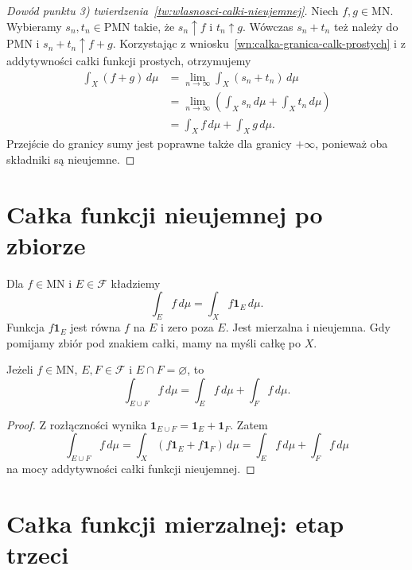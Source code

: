 \begin{proof}[Dowód punktu 3) twierdzenia~\ref{tw:wlasnosci-calki-nieujemnej}]
Niech $f,g\in\mathrm{MN}$. Wybieramy $s_n,t_n\in\mathrm{PMN}$ takie,
że $s_n\uparrow f$ i $t_n\uparrow g$. Wówczas $s_n+t_n$ też należy
do~$\mathrm{PMN}$ i $s_n+t_n\uparrow f+g$. Korzystając z
wniosku~\ref{wn:calka-granica-calk-prostych} i z addytywności całki
funkcji prostych, otrzymujemy
\begin{align*}
  \int_X(f+g)\,d\mu
  &=\lim_{n\to\infty}\int_X(s_n+t_n)\,d\mu\\
  &=\lim_{n\to\infty}\left(\int_X s_n\,d\mu+\int_X t_n\,d\mu\right)\\
  &=\int_X f\,d\mu+\int_X g\,d\mu.
\end{align*}
Przejście do granicy sumy jest poprawne także dla granicy $+\infty$,
ponieważ oba składniki są nieujemne.
\end{proof}

\section{Całka funkcji nieujemnej po zbiorze}
\label{sec:calka-nieujemnej-po-zbiorze}

\begin{definicja}
\label{def:calka-nieujemnej-po-zbiorze}
Dla $f\in\mathrm{MN}$ i $E\in\mathcal F$ kładziemy
\[
  \int_E f\,d\mu=\int_X f\mathbf{1}_E\,d\mu.
\]
Funkcja $f\mathbf{1}_E$ jest równa $f$ na $E$ i zero poza $E$.
Jest mierzalna i nieujemna. Gdy pomijamy zbiór pod znakiem całki,
mamy na myśli całkę po $X$.
\end{definicja}

\begin{fakt}
\label{fakt:calka-nieujemnej-po-rozlacznych}
Jeżeli $f\in\mathrm{MN}$, $E,F\in\mathcal F$ i $E\cap F=\varnothing$, to
\[
  \int_{E\cup F} f\,d\mu=\int_E f\,d\mu+\int_F f\,d\mu.
\]
\end{fakt}

\begin{proof}
Z rozłączności wynika $\mathbf{1}_{E\cup F}=\mathbf{1}_E+\mathbf{1}_F$.
Zatem
\[
  \int_{E\cup F} f\,d\mu
  =\int_X(f\mathbf{1}_E+f\mathbf{1}_F)\,d\mu
  =\int_E f\,d\mu+\int_F f\,d\mu
\]
na mocy addytywności całki funkcji nieujemnej.
\end{proof}

\section{Całka funkcji mierzalnej: etap trzeci}
\label{sec:calka-funkcji-etap-trzeci}

